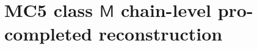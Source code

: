 %
%
%
%
%
%

\chapter{MC5 class \texorpdfstring{$\mathsf{M}$}{M} chain-level pro-completed reconstruction}
\label{chap:mc5-class-m-chain-level-platonic}

\providecommand{\KZ}{\mathrm{KZ}}
\providecommand{\Arn}{\mathrm{Arnold}}
\providecommand{\dbar}{d_{\mathrm{bar}}}
\providecommand{\Kosz}{\mathsf{Kosz}}
\providecommand{\co}{\mathrm{co}}
\providecommand{\SpCh}{\mathrm{Sp}^{\mathrm{ch}}}
\providecommand{\PhiFA}{\Phi^{\mathrm{FA}}}

